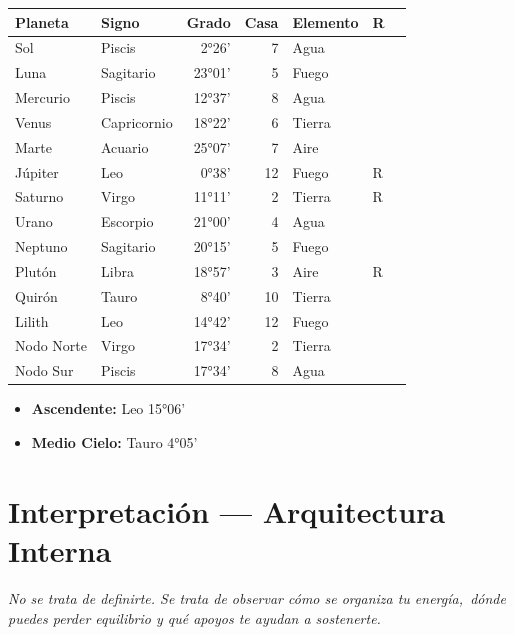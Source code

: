 \documentclass[11pt,a4paper]{article}
\begin{document}
\begin{center}
\begin{tabular}{llrrlll}
  \toprule
  \textbf{Planeta} & \textbf{Signo} & \textbf{Grado} & \textbf{Casa} &
  \textbf{Elemento} & \textbf{R} \\
  \midrule
  Sol & Piscis & 2°26' & 7 & Agua &  \\
  Luna & Sagitario & 23°01' & 5 & Fuego &  \\
  Mercurio & Piscis & 12°37' & 8 & Agua &  \\
  Venus & Capricornio & 18°22' & 6 & Tierra &  \\
  Marte & Acuario & 25°07' & 7 & Aire &  \\
  Júpiter & Leo & 0°38' & 12 & Fuego & R \\
  Saturno & Virgo & 11°11' & 2 & Tierra & R \\
  Urano & Escorpio & 21°00' & 4 & Agua &  \\
  Neptuno & Sagitario & 20°15' & 5 & Fuego &  \\
  Plutón & Libra & 18°57' & 3 & Aire & R \\
  Quirón & Tauro & 8°40' & 10 & Tierra &  \\
  Lilith & Leo & 14°42' & 12 & Fuego &  \\
  Nodo Norte & Virgo & 17°34' & 2 & Tierra &  \\
  Nodo Sur & Piscis & 17°34' & 8 & Agua &  \\
  \bottomrule
\end{tabular}
\end{center}

\vspace{0.5cm}
\begin{itemize}
  \item \textbf{Ascendente:} Leo 15°06'
  \item \textbf{Medio Cielo:} Tauro 4°05'
\end{itemize}

\newpage

\section{Interpretación — Arquitectura Interna}

\begin{center}
{\small\itshape
No se trata de definirte. Se trata de observar cómo se organiza tu energía,\
dónde puedes perder equilibrio y qué apoyos te ayudan a sostenerte.
}
\end{center}
\end{document}
